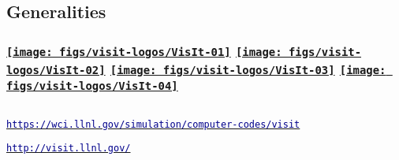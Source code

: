 \subsection{Generalities}
\begin{frame}
\frametitle{\href{https://wci.llnl.gov/simulation/computer-codes/visit/}{\texttt{[image: figs/visit-logos/VisIt-01]}} \href{https://wci.llnl.gov/simulation/computer-codes/visit/}{\texttt{[image: figs/visit-logos/VisIt-02]}} \href{https://wci.llnl.gov/simulation/computer-codes/visit/}{\texttt{[image: figs/visit-logos/VisIt-03]}} \href{https://wci.llnl.gov/simulation/computer-codes/visit/}{\texttt{[image: figs/visit-logos/VisIt-04]}} \hspace{-8.5cm}{\bf \textcolor{white}{VisIt}}}

%

\vspace{-3.5mm}
\begin{columns}%
\begin{column}{7.65cm}
\vspace{-2mm}
\href{https://wci.llnl.gov/simulation/computer-codes/visit}{\textcolor{DarkBlue}{\small\tt https://wci.llnl.gov/simulation/computer-codes/visit}}

\href{http://visit.llnl.gov/}{\textcolor{DarkBlue}{\tt http://visit.llnl.gov/}}


\end{column}
\end{columns}
\end{frame}
